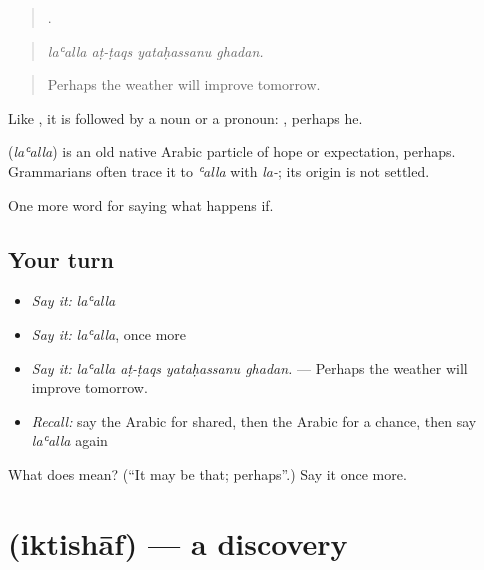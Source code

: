 \begin{quote}
   .
\end{quote}

\begin{quote}
\emph{laʿalla aṭ-ṭaqs yataḥassanu ghadan.}
\end{quote}

\begin{quote}
Perhaps the weather will improve tomorrow.
\end{quote}

Like , it is followed by a noun or a pronoun: , perhaps he.

\begin{cousinweb}
\textbf{} (\emph{laʿalla}) is an old native Arabic particle of hope or expectation, perhaps. Grammarians often trace it to \emph{ʿalla} with \emph{la-}; its origin is not settled.
\end{cousinweb}

\begin{grammarlens}[title={What you've built}]
One more word for saying what happens if.
\end{grammarlens}

\subsection*{Your turn}
\begin{itemize}
\raggedright
  \item \emph{Say it:} \emph{laʿalla}
  \item \emph{Say it:} \emph{laʿalla}, once more
  \item \emph{Say it:} \emph{laʿalla aṭ-ṭaqs yataḥassanu ghadan.} — Perhaps the weather will improve tomorrow.
  \item \emph{Recall:} say the Arabic for shared, then the Arabic for a chance, then say \emph{laʿalla} again
\end{itemize}

\begin{tcolorbox}[breakable,colback=teal!4,colframe=teal!35!black,title={Before you move on}]
What does  mean? (\textquotedblleft{}It may be that; perhaps\textquotedblright{}.) Say it once more.
\end{tcolorbox}
\section[\texorpdfstring{\ar{اكتشاف} (iktishāf)}{اكتشاف (iktishāf)}]{ (iktishāf) — a discovery}

